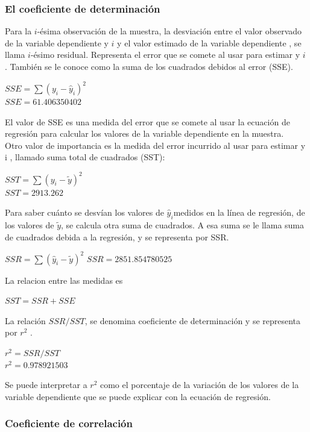 \documentclass[twocolumn,twoside]{article}
\begin{document}
\subsubsection{El coeficiente de determinaci\'on}

Para la $i$-\'esima observaci\'on de la muestra, la desviaci\'on entre el valor observado de la variable
dependiente y $i$ y el valor estimado de la variable dependiente , se llama $i$-\'esimo residual.
Representa el error que se comete al usar para estimar y $i$ . Tambi\'en se le conoce como la suma
de los cuadrados debidos al error (SSE).
\begin{center}
  $SSE=\sum (y_i - \hat y_i)^2$\\
  $SSE=61.406350402$

\end{center}
El valor de SSE es una medida del error que se comete al usar la ecuaci\'on de regresi\'on para
calcular los valores de la variable dependiente en la muestra.\\
Otro valor de importancia es la medida del error incurrido al usar para estimar y i , llamado suma
total de cuadrados (SST): \\
\begin{center}
  $SST=\sum (y_i - \tilde y)^2$ \\
  $SST=2913.262$

\end{center}
Para saber cu\'anto se desv\'ian los valores de $\hat y_i$medidos en la l\'inea de regresi\'on, de los valores
de $\tilde y$, se calcula otra suma de cuadrados. A esa suma se le llama suma de cuadrados debida a la
regresi\'on, y se representa por SSR.
\begin{center}
  $SSR=\sum (\hat y_i - \tilde y)^2$
  $SSR=2851.854780525$
\end{center}
La relacion entre las medidas es 
\begin{center}
  $SST=SSR+SSE$
\end{center}
La relaci\'on $SSR/SST$, se denomina coeficiente de determinaci\'on y se representa por $r^2$ .
\begin{center}
  $r^2=SSR/SST$\\
  $r^2=0.978921503$
\end{center}
Se puede interpretar a $r^2$ como el porcentaje de la variaci\'on de los valores de 
la variable dependiente que se puede explicar con la ecuaci\'on de regresi\'on.

\subsubsection{Coeficiente de correlaci\'on}
\end{document}
